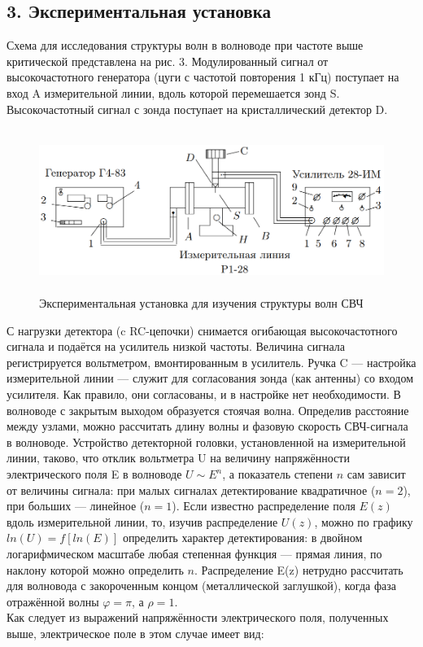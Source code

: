 \documentclass[a4paper,12pt]{article}
\begin{document}
\subsection*{3. Экспериментальная установка}

Схема для исследования структуры волн в волноводе при частоте выше критической представлена на рис. 3. Модулированный сигнал от высокочастотного генератора (цуги с частотой повторения 1 кГц) поступает на вход A измерительной линии, вдоль которой перемешается зонд S. Высокочастотный сигнал с зонда поступает на кристаллический детектор D.\\
\begin{figure}[H]
    \centering
    \includegraphics[width=13.5cm, height=5.3cm]{images/scheme1.jpg}
    \caption{Экспериментальная установка для изучения структуры волн СВЧ}
    \label{fig:scheme}
\end{figure}
С нагрузки детектора (c RC-цепочки) снимается огибающая высокочастотного сигнала и подаётся на усилитель низкой частоты. Величина сигнала регистрируется вольтметром, вмонтированным в усилитель. Ручка C — настройка измерительной линии — служит для согласования зонда (как антенны) со входом усилителя. Как правило, они согласованы, и в настройке нет необходимости. В волноводе с закрытым выходом образуется стоячая волна. Определив расстояние между узлами, можно рассчитать длину волны и фазовую скорость СВЧ-сигнала в волноводе. Устройство детекторной головки, установленной на измерительной линии, таково, что отклик вольтметра U на величину напряжённости электрического поля E в волноводе $U \sim E^n$, а показатель степени $n$ сам зависит от величины сигнала: при малых сигналах детектирование квадратичное ($n = 2$), при больших — линейное ($n = 1$). Если известно распределение поля $E(z)$ вдоль измерительной линии, то, изучив распределение $U(z)$, можно по графику $ln(U) = f[ln(E)]$ определить характер детектирования: в двойном логарифмическом масштабе любая степенная функция — прямая линия, по наклону которой можно определить $n$. Распределение E(z) нетрудно рассчитать для волновода с закороченным концом (металлической заглушкой), когда фаза отражённой волны $\varphi = \pi$, а $\rho = 1$.\\
Как следует из выражений напряжённости электрического поля, полученных выше, электрическое поле в этом случае имеет вид:
\end{document}
